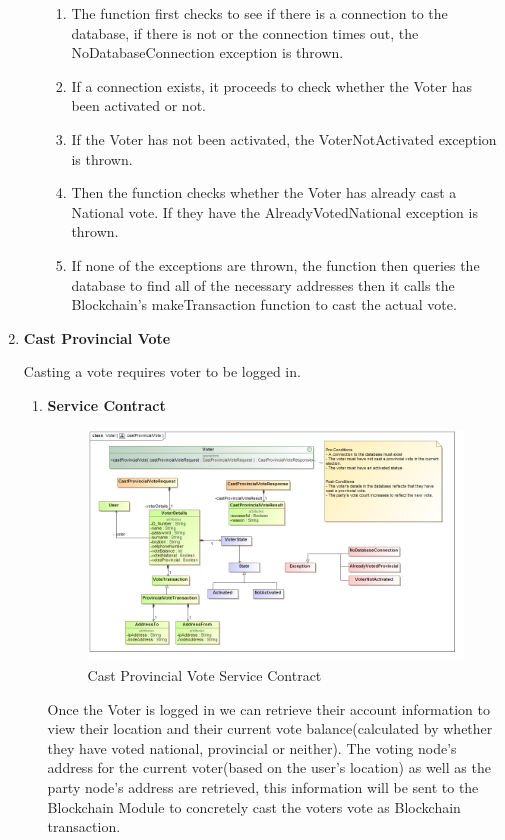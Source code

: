 \begin{enumerate}
\begin{enumerate}
		\begin{enumerate}
			\item The function first checks to see if there is a connection to the database, if there is not or the connection times out, the NoDatabaseConnection exception is thrown. 
			\item If a connection exists, it proceeds to check whether the Voter has been activated or not. 
			\item If the Voter has not been activated, the VoterNotActivated exception is thrown. 
			\item Then the function checks whether the Voter has already cast a National vote. If they have the AlreadyVotedNational exception is thrown.
			\item If none of the exceptions are thrown, the function then queries the database to find all of the necessary addresses then it calls the Blockchain's makeTransaction function to cast the actual vote.  
			
		\end{enumerate}
	\end{enumerate}

	\item \textbf{Cast Provincial Vote}
	
	Casting a vote requires voter to be logged in.
	
	\begin{enumerate}
		\item \textbf{Service Contract}
		\begin{figure}[H]
			\centering
			\includegraphics[width=0.75\linewidth]{../Images/Voter/ServiceContracts/castProvincialVote_serviceContract.png}
			\caption{Cast Provincial Vote Service Contract}
		\end{figure}
		
		Once the Voter is logged in we can retrieve their account information to view their location and their current vote balance(calculated by whether they have voted national, provincial or neither). \newline
		The voting node’s address for the current voter(based on the user’s location) as well as the party node’s address are retrieved, this information will be sent to the Blockchain Module to concretely cast the voters vote as Blockchain transaction.
		\newline				
		

\end{enumerate}
\end{enumerate}
